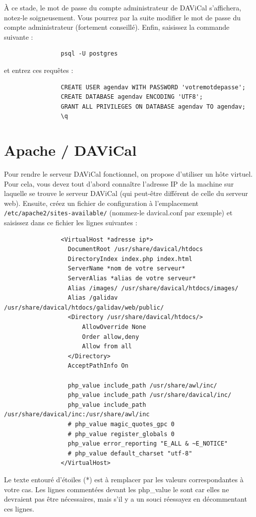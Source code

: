 \documentclass[a4paper, 11pt]{report}
\begin{document}
			À ce stade, le mot de passe du compte administrateur de DAViCal s’affichera, notez-le soigneusement. Vous pourrez par la suite modifier le mot de passe du compte administrateur (fortement conseillé).
			Enfin, saisissez la commande suivante :
			\begin{verbatim}
				psql -U postgres
			\end{verbatim}

			et entrez ces requêtes :
			\begin{verbatim}
				CREATE USER agendav WITH PASSWORD 'votremotdepasse';
				CREATE DATABASE agendav ENCODING 'UTF8';
				GRANT ALL PRIVILEGES ON DATABASE agendav TO agendav;
				\q
			\end{verbatim}

		\section{Apache / DAViCal}
			Pour rendre le serveur DAViCal fonctionnel, on propose d’utiliser un hôte virtuel. Pour cela, vous devez tout d’abord connaître l’adresse IP de la machine sur laquelle se trouve le serveur DAViCal (qui peut-être différent de celle du serveur web). Ensuite, créez un fichier de configuration à l’emplacement \texttt{/etc/apache2/sites-available/} (nommez-le davical.conf par exemple) et saisissez dans ce fichier les lignes suivantes :
			\begin{verbatim}
				<VirtualHost *adresse ip*>
				  DocumentRoot /usr/share/davical/htdocs
				  DirectoryIndex index.php index.html
				  ServerName *nom de votre serveur*
				  ServerAlias *alias de votre serveur*
				  Alias /images/ /usr/share/davical/htdocs/images/
				  Alias /galidav /usr/share/davical/htdocs/galidav/web/public/
				  <Directory /usr/share/davical/htdocs/>
				      AllowOverride None
				      Order allow,deny
				      Allow from all
				  </Directory>
				  AcceptPathInfo On

				  php_value include_path /usr/share/awl/inc/
				  php_value include_path /usr/share/davical/inc/
				  php_value include_path /usr/share/davical/inc:/usr/share/awl/inc
				  # php_value magic_quotes_gpc 0
				  # php_value register_globals 0
				  php_value error_reporting "E_ALL & ~E_NOTICE"
				  # php_value default_charset "utf-8"
				</VirtualHost>
			\end{verbatim}

			Le texte entouré d’étoiles (*) est à remplacer par les valeurs correspondantes à votre cas. Les lignes commentées devant les php\_value le sont car elles ne devraient pas être nécessaires, mais s’il y a un souci réessayez en décommentant ces lignes.
\end{document}
